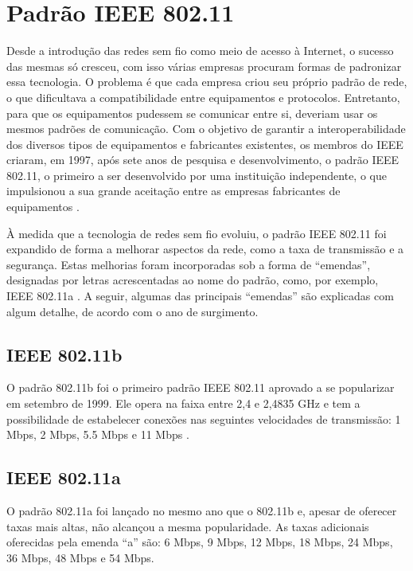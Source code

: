 \section{Padrão IEEE 802.11}
\label{padrao-ieee-802-11}

Desde a introdução das redes sem fio como meio de acesso à Internet, o sucesso das mesmas só cresceu, com isso várias empresas procuram formas de padronizar essa tecnologia. O problema é que cada empresa criou seu próprio padrão de rede, o que dificultava a compatibilidade entre equipamentos e protocolos.
Entretanto, para que os equipamentos pudessem se comunicar entre si, deveriam usar os mesmos padrões de comunicação. Com o objetivo de garantir a interoperabilidade dos diversos tipos de equipamentos e fabricantes existentes, os membros do IEEE criaram, em 1997, após sete anos de pesquisa e desenvolvimento, o padrão IEEE 802.11, o primeiro a ser desenvolvido por uma instituição independente, o que impulsionou a sua grande aceitação entre as empresas fabricantes de equipamentos \cite{fluminense2010}.

À medida que a tecnologia de redes sem fio evoluiu, o padrão IEEE 802.11 foi expandido de forma a melhorar aspectos da rede, como a taxa de transmissão e a segurança. Estas melhorias foram incorporadas sob a forma de ``emendas'', designadas por letras acrescentadas ao nome do padrão, como, por exemplo, IEEE 802.11a \cite{fluminense2010}. A seguir, algumas das principais ``emendas'' são explicadas com algum detalhe, de acordo com o ano de surgimento.

\subsection{IEEE 802.11b}
\label{802-11b}

O padrão 802.11b foi o primeiro padrão IEEE 802.11 aprovado a se popularizar em setembro de 1999. Ele opera na faixa entre 2,4 e 2,4835 GHz e tem a possibilidade de estabelecer conexões nas seguintes velocidades de transmissão: 1 Mbps, 2 Mbps, 5.5 Mbps e 11 Mbps \cite{moraes2010,fluminense2010}.

\subsection{IEEE 802.11a}
\label{802-11a}

O padrão 802.11a foi lançado no mesmo ano que o 802.11b e, apesar de oferecer taxas mais altas, não alcançou a mesma popularidade. As taxas adicionais oferecidas pela emenda “a” são: 6 Mbps, 9 Mbps, 12 Mbps, 18 Mbps, 24 Mbps, 36 Mbps, 48 Mbps e 54 Mbps.

